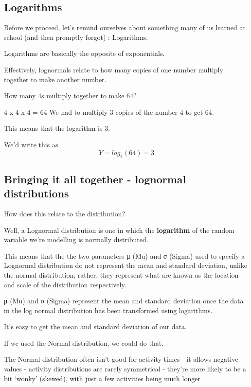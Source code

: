 \documentclass[
  letterpaper,
  DIV=11,
  numbers=noendperiod]{scrreprt}
\begin{document}
\subsection{Logarithms}\label{logarithms}

Before we proceed, let's remind ourselves about something many of us
learned at school (and then promptly forgot) : Logarithms.

Logarithms are basically the opposite of exponentials.

Effectively, lognormals relate to how many copies of one number multiply
together to make another number.

How many 4s multiply together to make 64?

4 x 4 x 4 = 64 We had to multiply 3 copies of the number 4 to get 64.

This means that the logarithm is 3.

We'd write this as \[
Y = log_4(64) = 3
\]

\subsection{Bringing it all together - lognormal
distributions}\label{bringing-it-all-together---lognormal-distributions}

How does this relate to the distribution?

Well, a Lognormal distribution is one in which the \textbf{logarithm} of
the random variable we're modelling is normally distributed.

This means that the the two parameters μ (Mu) and σ (Sigma) used to
specify a Lognormal distribution do not represent the mean and standard
deviation, unlike the normal distribution; rather, they represent what
are known as the location and scale of the distribution respectively.

μ (Mu) and σ (Sigma) represent the mean and standard deviation once the
data in the log normal distribution has been transformed using
logarithms.

It's easy to get the mean and standard deviation of our data.

If we used the Normal distribution, we could do that.

\begin{tcolorbox}[enhanced jigsaw, colframe=quarto-callout-warning-color-frame, bottomtitle=1mm, breakable, rightrule=.15mm, coltitle=black, colbacktitle=quarto-callout-warning-color!10!white, opacityback=0, leftrule=.75mm, arc=.35mm, toptitle=1mm, title=\textcolor{quarto-callout-warning-color}{\faExclamationTriangle}\hspace{0.5em}{Warning}, titlerule=0mm, colback=white, toprule=.15mm, bottomrule=.15mm, left=2mm, opacitybacktitle=0.6]

The Normal distribution often isn't good for activity times - it allows
negative values - activity distributions are rarely symmetrical -
they're more likely to be a bit `wonky' (skewed), with just a few
activities being much longer

\end{tcolorbox}
\end{document}
